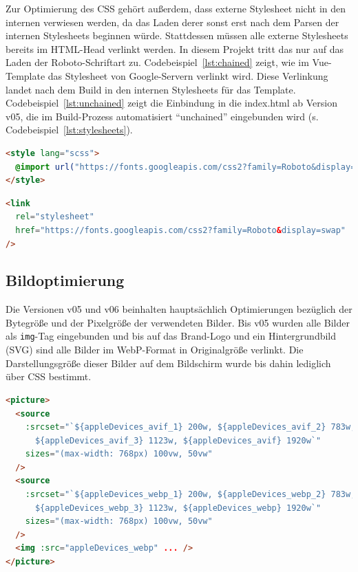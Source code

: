 \documentclass[11pt,a4paper]{article}
\begin{document}
Zur Optimierung des CSS gehört außerdem, dass externe Stylesheet nicht in den internen verwiesen werden, da das Laden derer sonst erst nach dem Parsen der internen Stylesheets beginnen würde.
Stattdessen müssen alle externe Stylesheets bereits im HTML-Head verlinkt werden.
In diesem Projekt tritt das nur auf das Laden der Roboto-Schriftart zu.
Codebeispiel~\ref{lst:chained} zeigt, wie im Vue-Template das Stylesheet von Google-Servern verlinkt wird.
Diese Verlinkung landet nach dem Build in den internen Stylesheets für das Template.
Codebeispiel~\ref{lst:unchained} zeigt die Einbindung in die index.html ab Version v05, die im Build-Prozess automatisiert \enquote{unchained} eingebunden wird (s. Codebeispiel~\ref{lst:stylesheets}).

\begin{lstlisting}[language=html, caption={Chained Request im Vue-Template}, label={lst:chained}]
<style lang="scss">
  @import url("https://fonts.googleapis.com/css2?family=Roboto&display=swap");
</style>
\end{lstlisting}
\begin{lstlisting}[language=html, caption={Un-Chained Request im HTML (index.html)}, label={lst:unchained}]
<link
  rel="stylesheet"
  href="https://fonts.googleapis.com/css2?family=Roboto&display=swap"
/>
\end{lstlisting}

\subsection{Bildoptimierung}
Die Versionen v05 und v06 beinhalten hauptsächlich Optimierungen bezüglich der Bytegröße und der Pixelgröße der verwendeten Bilder.
Bis v05 wurden alle Bilder als \verb|img|-Tag eingebunden und bis auf das Brand-Logo und ein Hintergrundbild (SVG) sind alle Bilder im WebP-Format in Originalgröße verlinkt.
Die Darstellungsgröße dieser Bilder auf dem Bildschirm wurde bis dahin lediglich über CSS bestimmt.

\begin{lstlisting}[language=html, caption={Einbindung von Bildern als picture-Tag}, label={lst:images}]
<picture>
  <source
    :srcset="`${appleDevices_avif_1} 200w, ${appleDevices_avif_2} 783w,
      ${appleDevices_avif_3} 1123w, ${appleDevices_avif} 1920w`"
    sizes="(max-width: 768px) 100vw, 50vw"
  />
  <source
    :srcset="`${appleDevices_webp_1} 200w, ${appleDevices_webp_2} 783w,
      ${appleDevices_webp_3} 1123w, ${appleDevices_webp} 1920w`"
    sizes="(max-width: 768px) 100vw, 50vw"
  />
  <img :src="appleDevices_webp" ... />
</picture>
\end{lstlisting}
\end{document}
